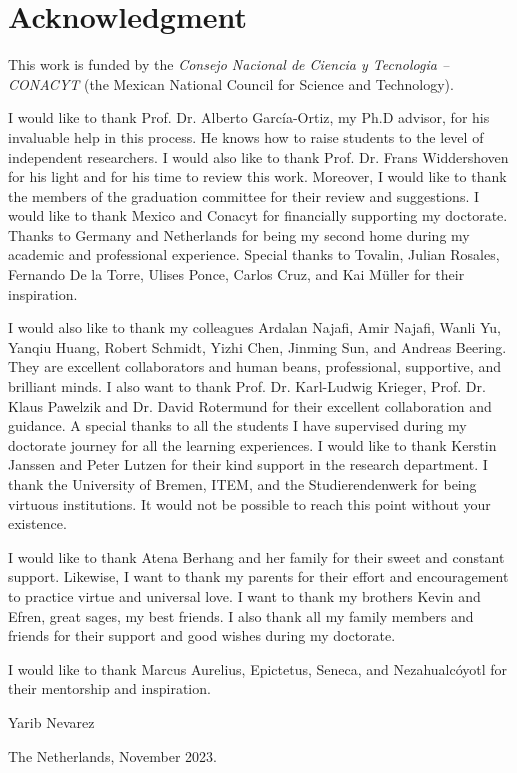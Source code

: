 \chapter*{Acknowledgment}
\thispagestyle{empty}
This work is funded by the \textit{Consejo Nacional de Ciencia y Tecnologia -- CONACYT} (the Mexican National Council for Science and Technology).

I would like to thank Prof. Dr. Alberto Garc\'ia-Ortiz, my Ph.D advisor, for his invaluable help in this process. He knows how to raise students to the level of independent researchers. I would also like to thank Prof. Dr. Frans Widdershoven for his light and for his time to review this work. Moreover, I would like to thank the members of the graduation committee for their review and suggestions. I would like to thank Mexico and Conacyt for financially supporting my doctorate. Thanks to Germany and Netherlands for being my second home during my academic and professional experience. Special thanks to Tovalin, Julian Rosales, Fernando De la Torre, Ulises Ponce, Carlos Cruz, and Kai M\"uller for their inspiration.

I would also like to thank my colleagues Ardalan Najafi, Amir Najafi, Wanli Yu, Yanqiu Huang, Robert Schmidt, Yizhi Chen, Jinming Sun, and Andreas Beering. They are excellent collaborators and human beans, professional, supportive, and brilliant minds. I also want to thank Prof. Dr. Karl-Ludwig Krieger, Prof. Dr. Klaus Pawelzik and Dr. David Rotermund for their excellent collaboration and guidance. A special thanks to all the students I have supervised during my doctorate journey for all the learning experiences. I would like to thank Kerstin Janssen and Peter Lutzen for their kind support in the research department. I thank the University of Bremen, ITEM, and the Studierendenwerk for being virtuous institutions. It would not be possible to reach this point without your existence.


I would like to thank Atena Berhang and her family for their sweet and constant support. Likewise, I want to thank my parents for their effort and encouragement to practice virtue and universal love. I want to thank my brothers Kevin and Efren, great sages, my best friends. I also thank all my family members and friends for their support and good wishes during my doctorate.

I would like to thank Marcus Aurelius, Epictetus, Seneca, and Nezahualc\'oyotl for their mentorship and inspiration.


Yarib Nevarez

The Netherlands, November 2023.

